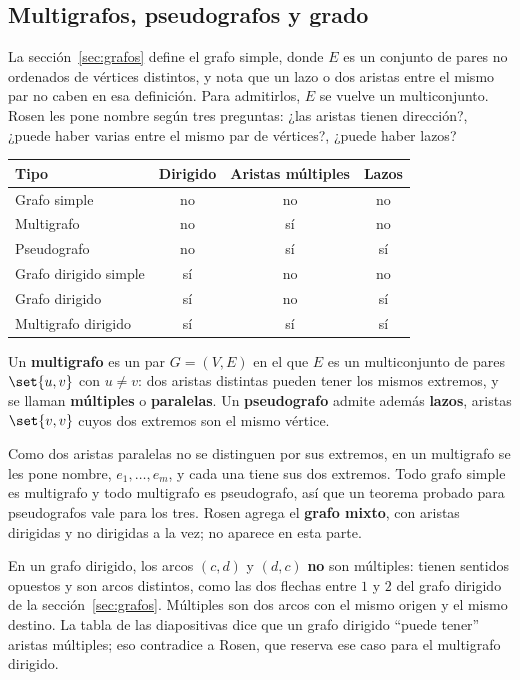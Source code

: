 \documentclass[11pt,letterpaper]{article}
\begin{document}
\subsection*{Multigrafos, pseudografos y grado}

La sección~\ref{sec:grafos} define el grafo simple, donde $E$ es un
conjunto de pares no ordenados de vértices distintos, y nota que un
lazo o dos aristas entre el mismo par no caben en esa definición. Para
admitirlos, $E$ se vuelve un multiconjunto. Rosen les pone nombre
según tres preguntas: ¿las aristas tienen dirección?, ¿puede haber
varias entre el mismo par de vértices?, ¿puede haber lazos?

\begin{center}
\small
\begin{tabular}{lccc}
  \toprule
  \textbf{Tipo} & \textbf{Dirigido} & \textbf{Aristas múltiples}
    & \textbf{Lazos} \\
  \midrule
  Grafo simple & no & no & no \\
  Multigrafo & no & sí & no \\
  Pseudografo & no & sí & sí \\
  Grafo dirigido simple & sí & no & no \\
  Grafo dirigido & sí & no & sí \\
  Multigrafo dirigido & sí & sí & sí \\
  \bottomrule
\end{tabular}
\end{center}

\begin{definicion}
  \label{def:pseudografo}
  Un \textbf{multigrafo} es un par $G = (V, E)$ en el que $E$ es un
  multiconjunto de pares $\set{u, v}$ con $u \neq v$: dos aristas
  distintas pueden tener los mismos extremos, y se llaman
  \textbf{múltiples} o \textbf{paralelas}. Un \textbf{pseudografo}
  admite además \textbf{lazos}, aristas $\set{v, v}$ cuyos dos extremos
  son el mismo vértice.
\end{definicion}

Como dos aristas paralelas no se distinguen por sus extremos, en un
multigrafo se les pone nombre, $e_1, \dots, e_m$, y cada una tiene sus
dos extremos. Todo grafo simple es multigrafo y todo multigrafo es
pseudografo, así que un teorema probado para pseudografos vale para
los tres. Rosen agrega el \textbf{grafo mixto}, con aristas dirigidas y
no dirigidas a la vez; no aparece en esta parte.

\begin{ojo}
  En un grafo dirigido, los arcos $(c, d)$ y $(d, c)$ \textbf{no} son
  múltiples: tienen sentidos opuestos y son arcos distintos, como las
  dos flechas entre $1$ y $2$ del grafo dirigido de la
  sección~\ref{sec:grafos}. Múltiples son dos arcos con el mismo origen
  y el mismo destino. La tabla de las diapositivas dice que un grafo
  dirigido ``puede tener'' aristas múltiples; eso contradice a Rosen,
  que reserva ese caso para el multigrafo dirigido.
\end{ojo}
\end{document}
